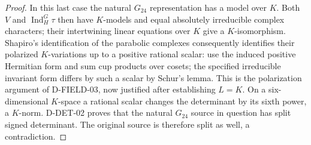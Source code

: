 \begin{proof}
In this last case the natural $G_{24}$ representation has a model
over $K$.  Both $V$ and $\operatorname{Ind}_H^G\tau$ then have
$K$-models and equal absolutely irreducible complex characters;
their intertwining linear equations over $K$ give a $K$-isomorphism.
Shapiro's identification of the parabolic complexes consequently
identifies their polarized $K$-variations up to a positive rational
scalar: use the induced positive Hermitian form and sum cup products
over cosets; the specified irreducible invariant form differs by
such a scalar by Schur's lemma.  This is the polarization argument
of D-FIELD-03, now justified after establishing $L=K$.
On a six-dimensional $K$-space a rational scalar changes the
determinant by its sixth power, a $K$-norm.  D-DET-02 proves that
the natural $G_{24}$ source in question has split signed determinant.
The original source is therefore split as well, a contradiction.
\end{proof}

